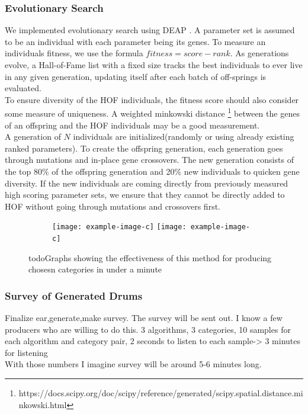 \documentclass{nime-alternate} %
\begin{document}
\subsubsection{Evolutionary Search}
We implemented evolutionary search using DEAP \citep{DEAP_JMLR2012}. A parameter set is assumed to be an individual with each parameter being its genes. To measure an individuals fitness, we use the formula $fitness=score-rank$. As generations evolve, a Hall-of-Fame list with a fixed size tracks the best individuals to ever live in any given generation, updating itself after each batch of off-springs is evaluated.\\
To ensure diversity of the HOF individuals, the fitness score should also consider some measure of uniqueness. A weighted minkowski distance \footnote{https://docs.scipy.org/doc/scipy/reference/generated/scipy.spatial.distance.minkowski.html} between the genes of an offspring and the HOF individuals may be a good measurement.\\
A generation of $N$ individuals are initialized(randomly or using already existing ranked parameters). To create the offspring generation, each generation goes through mutations and in-place gene crossovers. The new generation consists of the top 80\% of the offspring generation and 20\% new individuals to quicken gene diversity. If the new individuals are coming directly from previously measured high scoring parameter sets, we ensure that they cannot be directly added to HOF without going through mutations and crossovers first.\\

\begin{figure}[H]
\centering
\begin{subfigure}[b]{\linewidth}
\texttt{[image: example-image-c]}
\texttt{[image: example-image-c]}
\label{fig:1stack}
\setcounter{subfigure}{2}%
\end{subfigure}
\caption{\colorbox{green!=40}{todo}Graphs showing the effectiveness of this method for producing chosesn categories in under a minute}
\label{fig:evo-graphs}
\end{figure}
\subsubsection{Survey of Generated Drums}
\label{survey}
\colorbox{green!=30}{Finalize ear,generate,make survey.} The survey will be sent out. I know a few producers who are willing to do this.
3 algorithms, 3 categories, 10 samples for each algorithm and category pair, 2 seconds to listen to each sample-> 3 minutes for listening\\
With those numbers I imagine survey will be around 5-6 minutes long.
\end{document}

